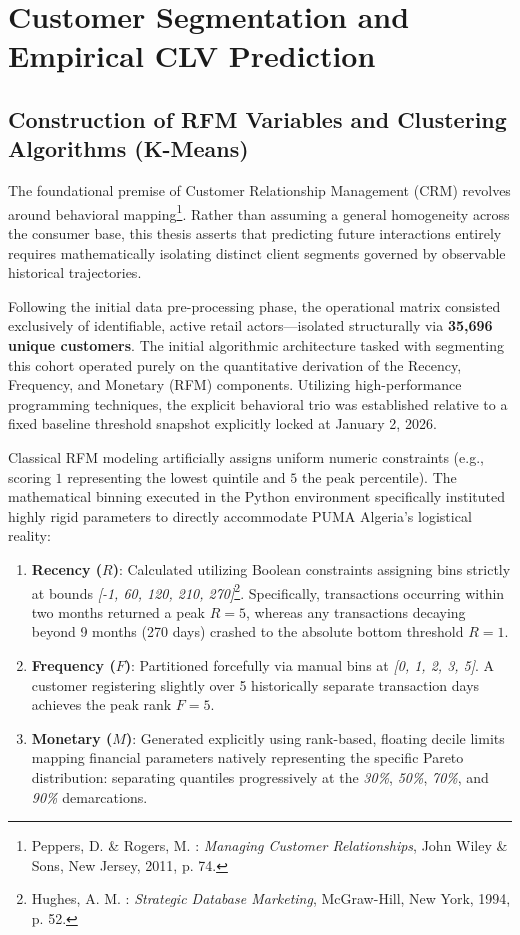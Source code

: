 \documentclass[12pt,a4paper]{report}
\begin{document}
\section{Customer Segmentation and Empirical CLV Prediction}

\subsection{Construction of RFM Variables and Clustering Algorithms (K-Means)}
The foundational premise of Customer Relationship Management (CRM) revolves around behavioral mapping\footnote{Peppers, D. \& Rogers, M. : \textit{Managing Customer Relationships}, John Wiley \& Sons, New Jersey, 2011, p. 74.}. Rather than assuming a general homogeneity across the consumer base, this thesis asserts that predicting future interactions entirely requires mathematically isolating distinct client segments governed by observable historical trajectories.

Following the initial data pre-processing phase, the operational matrix consisted exclusively of identifiable, active retail actors—isolated structurally via \textbf{35,696 unique customers}. The initial algorithmic architecture tasked with segmenting this cohort operated purely on the quantitative derivation of the Recency, Frequency, and Monetary (RFM) components. Utilizing high-performance programming techniques, the explicit behavioral trio was established relative to a fixed baseline threshold snapshot explicitly locked at January 2, 2026.

Classical RFM modeling artificially assigns uniform numeric constraints (e.g., scoring $1$ representing the lowest quintile and $5$ the peak percentile). The mathematical binning executed in the Python environment specifically instituted highly rigid parameters to directly accommodate PUMA Algeria's logistical reality:
\begin{enumerate}
    \item \textbf{Recency ($R$)}: Calculated utilizing Boolean constraints assigning bins strictly at bounds \textit{[-1, 60, 120, 210, 270]}\footnote{Hughes, A. M. : \textit{Strategic Database Marketing}, McGraw-Hill, New York, 1994, p. 52.}. Specifically, transactions occurring within two months returned a peak $R=5$, whereas any transactions decaying beyond 9 months (270 days) crashed to the absolute bottom threshold $R=1$.
    \item \textbf{Frequency ($F$)}: Partitioned forcefully via manual bins at \textit{[0, 1, 2, 3, 5]}. A customer registering slightly over 5 historically separate transaction days achieves the peak rank $F=5$.
    \item \textbf{Monetary ($M$)}: Generated explicitly using rank-based, floating decile limits mapping financial parameters natively representing the specific Pareto distribution: separating quantiles progressively at the \textit{30\%}, \textit{50\%}, \textit{70\%}, and \textit{90\%} demarcations.
\end{enumerate}
\end{document}
